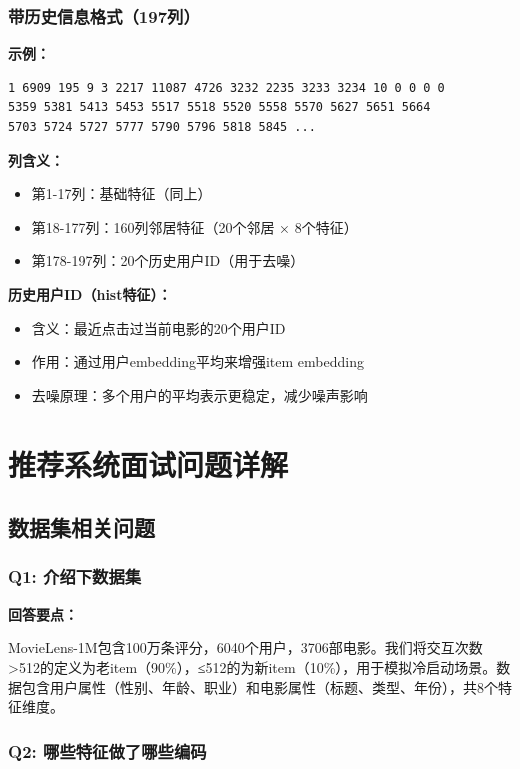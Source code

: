 \documentclass[12pt,a4paper]{article}
\begin{document}
\subsubsection{带历史信息格式（197列）}

\textbf{示例：}
\begin{lstlisting}
1 6909 195 9 3 2217 11087 4726 3232 2235 3233 3234 10 0 0 0 0 
5359 5381 5413 5453 5517 5518 5520 5558 5570 5627 5651 5664 
5703 5724 5727 5777 5790 5796 5818 5845 ...
\end{lstlisting}

\textbf{列含义：}
\begin{itemize}
    \item 第1-17列：基础特征（同上）
    \item 第18-177列：160列邻居特征（20个邻居 × 8个特征）
    \item 第178-197列：20个历史用户ID（用于去噪）
\end{itemize}

\textbf{历史用户ID（hist特征）：}
\begin{itemize}
    \item 含义：最近点击过当前电影的20个用户ID
    \item 作用：通过用户embedding平均来增强item embedding
    \item 去噪原理：多个用户的平均表示更稳定，减少噪声影响
\end{itemize}

\section{推荐系统面试问题详解}

\subsection{数据集相关问题}

\subsubsection{Q1: 介绍下数据集}

\textbf{回答要点：}

MovieLens-1M包含100万条评分，6040个用户，3706部电影。我们将交互次数>512的定义为老item（90\%），≤512的为新item（10\%），用于模拟冷启动场景。数据包含用户属性（性别、年龄、职业）和电影属性（标题、类型、年份），共8个特征维度。

\subsubsection{Q2: 哪些特征做了哪些编码}
\end{document}
